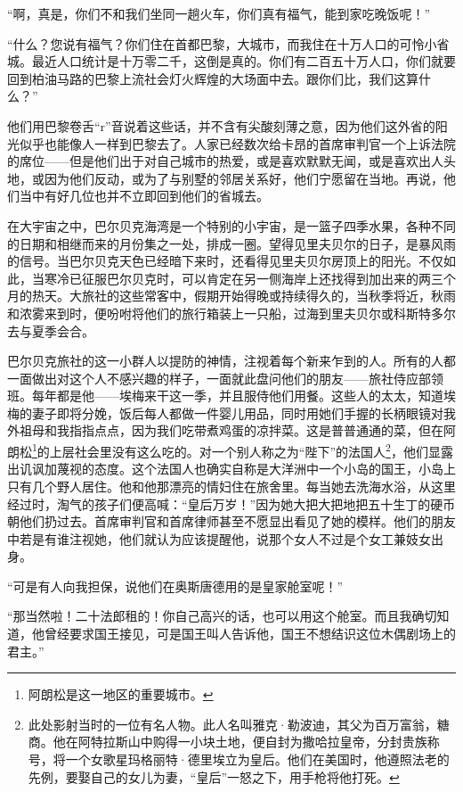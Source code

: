 \par “啊，真是，你们不和我们坐同一趟火车，你们真有福气，能到家吃晚饭呢！”
\par “什么？您说有福气？你们住在首都巴黎，大城市，而我住在十万人口的可怜小省城。最近人口统计是十万零二千，这倒是真的。你们有二百五十万人口，你们就要回到柏油马路的巴黎上流社会灯火辉煌的大场面中去。跟你们比，我们这算什么？”
\par 他们用巴黎卷舌“r”音说着这些话，并不含有尖酸刻薄之意，因为他们这外省的阳光似乎也能像人一样到巴黎去了。人家已经数次给卡昂的首席审判官一个上诉法院的席位——但是他们出于对自己城市的热爱，或是喜欢默默无闻，或是喜欢出人头地，或因为他们反动，或为了与别墅的邻居关系好，他们宁愿留在当地。再说，他们当中有好几位也并不立即回到他们的省城去。
\par 在大宇宙之中，巴尔贝克海湾是一个特别的小宇宙，是一篮子四季水果，各种不同的日期和相继而来的月份集之一处，排成一圈。望得见里夫贝尔的日子，是暴风雨的信号。当巴尔贝克天色已经暗下来时，还看得见里夫贝尔房顶上的阳光。不仅如此，当寒冷已征服巴尔贝克时，可以肯定在另一侧海岸上还找得到加出来的两三个月的热天。大旅社的这些常客中，假期开始得晚或持续得久的，当秋季将近，秋雨和浓雾来到时，便吩咐将他们的旅行箱装上一只船，过海到里夫贝尔或科斯特多尔去与夏季会合。
\par 巴尔贝克旅社的这一小群人以提防的神情，注视着每个新来乍到的人。所有的人都一面做出对这个人不感兴趣的样子，一面就此盘问他们的朋友——旅社侍应部领班。每年都是他——埃梅来干这一季，并且服侍他们用餐。这些人的太太，知道埃梅的妻子即将分娩，饭后每人都做一件婴儿用品，同时用她们手握的长柄眼镜对我外祖母和我指指点点，因为我们吃带煮鸡蛋的凉拌菜。这是普普通通的菜，但在阿朗松\footnote{阿朗松是这一地区的重要城市。}的上层社会里没有这么吃的。对一个别人称之为“陛下”的法国人\footnote{此处影射当时的一位有名人物。此人名叫雅克·勒波迪，其父为百万富翁，糖商。他在阿特拉斯山中购得一小块土地，便自封为撒哈拉皇帝，分封贵族称号，将一个女歌星玛格丽特·德里埃立为皇后。他们在美国时，他遵照法老的先例，要娶自己的女儿为妻，“皇后”一怒之下，用手枪将他打死。}，他们显露出讥讽加蔑视的态度。这个法国人也确实自称是大洋洲中一个小岛的国王，小岛上只有几个野人居住。他和他那漂亮的情妇住在旅舍里。每当她去洗海水浴，从这里经过时，淘气的孩子们便高喊：“皇后万岁！”因为她大把大把地把五十生丁的硬币朝他们扔过去。首席审判官和首席律师甚至不愿显出看见了她的模样。他们的朋友中若是有谁注视她，他们就认为应该提醒他，说那个女人不过是个女工兼妓女出身。
\par “可是有人向我担保，说他们在奥斯唐德用的是皇家舱室呢！”
\par “那当然啦！二十法郎租的！你自己高兴的话，也可以用这个舱室。而且我确切知道，他曾经要求国王接见，可是国王叫人告诉他，国王不想结识这位木偶剧场上的君主。”
